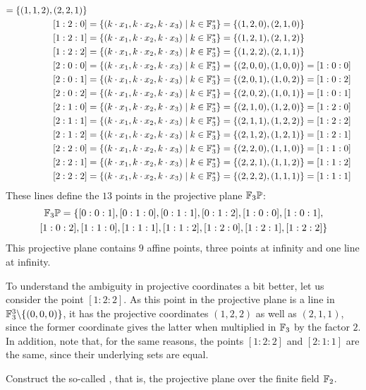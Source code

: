\begin{example}
\begin{align*}
          = \{(1,1,2), (2,2,1)\}\\
[1:2:0] &= \{(k\cdot x_1,k\cdot x_2, k\cdot x_3)\;|\; k\in\mathbb{F}_3^*\}
          = \{(1,2,0), (2,1,0)\}\\
[1:2:1] &= \{(k\cdot x_1,k\cdot x_2, k\cdot x_3)\;|\; k\in\mathbb{F}_3^*\}
          = \{(1,2,1), (2,1,2)\}\\
[1:2:2] &= \{(k\cdot x_1,k\cdot x_2, k\cdot x_3)\;|\; k\in\mathbb{F}_3^*\}
          = \{(1,2,2), (2,1,1)\}\\
[2:0:0] &= \{(k\cdot x_1,k\cdot x_2, k\cdot x_3)\;|\; k\in\mathbb{F}_3^*\}
          = \{(2,0,0), (1,0,0)\}
          = [1:0:0]\\
[2:0:1] &= \{(k\cdot x_1,k\cdot x_2, k\cdot x_3)\;|\; k\in\mathbb{F}_3^*\}
          = \{(2,0,1), (1,0,2)\}
          = [1:0:2]\\
[2:0:2] &= \{(k\cdot x_1,k\cdot x_2, k\cdot x_3)\;|\; k\in\mathbb{F}_3^*\}
          = \{(2,0,2), (1,0,1)\}
          = [1:0:1]\\
[2:1:0] &= \{(k\cdot x_1,k\cdot x_2, k\cdot x_3)\;|\; k\in\mathbb{F}_3^*\}
          = \{(2,1,0), (1,2,0)\}
          = [1:2:0]\\
[2:1:1] &= \{(k\cdot x_1,k\cdot x_2, k\cdot x_3)\;|\; k\in\mathbb{F}_3^*\}
          = \{(2,1,1), (1,2,2)\}
          = [1:2:2]\\
[2:1:2] &= \{(k\cdot x_1,k\cdot x_2, k\cdot x_3)\;|\; k\in\mathbb{F}_3^*\}
          = \{(2,1,2), (1,2,1)\}
          = [1:2:1]\\
[2:2:0] &= \{(k\cdot x_1,k\cdot x_2, k\cdot x_3)\;|\; k\in\mathbb{F}_3^*\}
          = \{(2,2,0), (1,1,0)\}
          = [1:1:0]\\
[2:2:1] &= \{(k\cdot x_1,k\cdot x_2, k\cdot x_3)\;|\; k\in\mathbb{F}_3^*\}
          = \{(2,2,1), (1,1,2)\}
          = [1:1:2]\\
[2:2:2] &= \{(k\cdot x_1,k\cdot x_2, k\cdot x_3)\;|\; k\in\mathbb{F}_3^*\}
          = \{(2,2,2), (1,1,1)\}
          = [1:1:1]
\end{align*}
These lines define the $13$ points in the projective plane $\mathbb{F}_3\mathbb{P}$:
\begin{multline*}
\mathbb{F}_3\mathbb{P} = \{ [0:0:1], [0:1:0], [0:1:1], [0:1:2], [1:0:0], [1:0:1], \\ [1:0:2], [1:1:0], [1:1:1], [1:1:2], [1:2:0], [1:2:1], [1:2:2]\}
\end{multline*}
This projective plane contains $9$ affine points, three points at infinity and one line at infinity.

To understand the ambiguity in projective coordinates a bit better, let us consider the point $[1:2:2]$. As this point in the projective plane is a line in $\mathbb{F}_3^3\backslash\{(0,0,0)\}$, it has the projective coordinates $(1,2,2)$ as well as $(2,1,1)$, since the former coordinate gives the latter when multiplied in $\mathbb{F}_3$ by the factor $2$. In addition, note that, for the same reasons, the points $[1:2:2]$ and $[2:1:1]$ are the same, since their underlying sets are equal.
\end{example}
\begin{exercise}
Construct the so-called , that is, the projective plane over the finite field $\mathbb{F}_2$.
\end{exercise}

